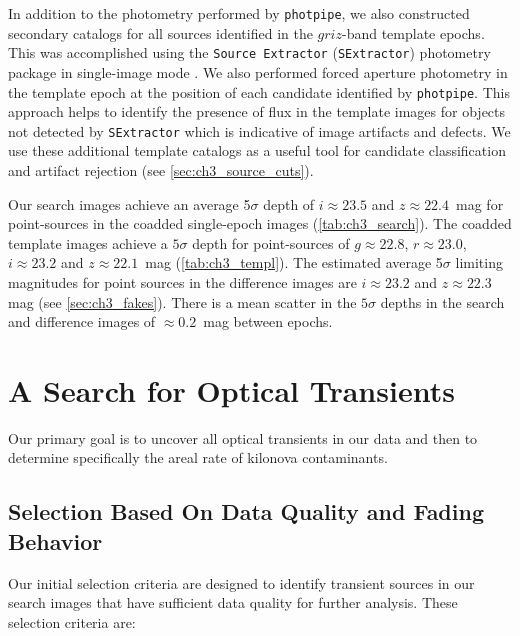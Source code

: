 In addition to the photometry performed by {\tt photpipe}, we also constructed secondary catalogs for all sources identified in the $griz$-band template epochs. This was accomplished using the {\tt Source Extractor} ({\tt SExtractor}) photometry package in single-image mode \citep{BertinArnouts96}. We also performed forced aperture photometry in the template epoch at the position of each candidate identified by {\tt photpipe}. This approach helps to identify the presence of flux in the template images for objects not detected by {\tt SExtractor} which is indicative of image artifacts and defects. We use these additional template catalogs as a useful tool for candidate classification and artifact rejection (see \cref{sec:ch3_source_cuts}).

Our search images achieve an average 5$\sigma$ depth of $i \approx 23.5$ and $z \approx 22.4$~mag for point-sources in the coadded single-epoch images (\cref{tab:ch3_search}). The coadded template images achieve a $5\sigma$ depth for point-sources of $g \approx 22.8$, $r \approx 23.0$, $i \approx 23.2$ and $z \approx 22.1$~mag (\cref{tab:ch3_templ}). The estimated average 5$\sigma$ limiting magnitudes for point sources in the difference images are $i \approx 23.2$ and $z \approx 22.3$ mag (see \cref{sec:ch3_fakes}). There is a mean scatter in the $5\sigma$ depths in the search and difference images of $\approx 0.2$~mag between epochs.


\section{A Search for Optical Transients}
\label{sec:ch3_search}

Our primary goal is to uncover all optical transients in our data and then to determine specifically the areal rate of kilonova contaminants.

\subsection{Selection Based On Data Quality and Fading Behavior}
\label{sec:ch3_data_cuts}

Our initial selection criteria are designed to identify transient sources in our search images that have sufficient data quality for further analysis. These selection criteria are:

